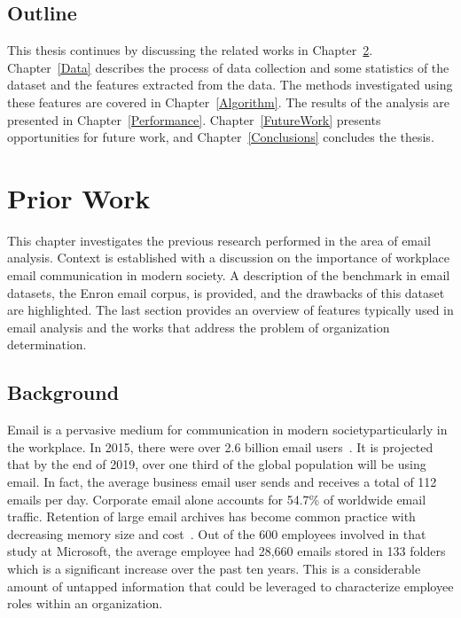 \documentclass[12pt]{report}
\begin{document}
\section{Outline}
This thesis continues by discussing the related works in Chapter~\ref{PriorWork}.  
Chapter~\ref{Data} describes the process of data collection and some statistics of the dataset and the features extracted from the data.
The methods investigated using these features are covered in Chapter~\ref{Algorithm}.
The results of the analysis are presented in Chapter~\ref{Performance}.
 Chapter~\ref{FutureWork} presents opportunities for future work, and Chapter~\ref{Conclusions} concludes the thesis.


\chapter{Prior Work} \label{PriorWork}
This chapter investigates the previous research performed in the area of email analysis.
Context is established with a discussion on the importance of workplace email communication in modern society.
A description of the benchmark in email datasets, the Enron email corpus, is provided, and the drawbacks of this dataset are highlighted.
The last section provides an overview of features typically used in email analysis and the works that address the problem of organization determination.

\section{Background}
Email is a pervasive medium for communication in modern society\textemdash{}particularly in the workplace.
In 2015, there were over 2.6 billion email users~\cite{radicati_emails_2015}.
It is projected that by the end of 2019, over one third of the global population will be using email.
In fact, the average business email user sends and receives a total of 112 emails per day.
Corporate email alone accounts for 54.7\% of worldwide email traffic.
Retention of large email archives has become common practice with decreasing memory size and cost~\cite{fisher_revisiting_2006}.
Out of the 600 employees involved in that study at Microsoft, the average employee had 28,660 emails stored in 133 folders which is a significant increase over the past ten years.
This is a considerable amount of untapped information that could be leveraged to characterize employee roles within an organization.
\end{document}
